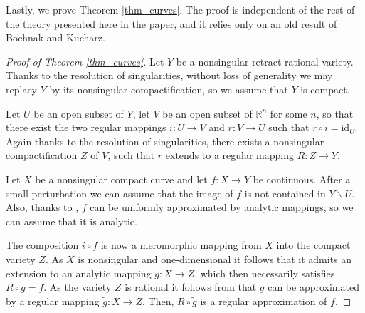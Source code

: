 \documentclass{article}
\theoremstyle{plain}
\theoremstyle{definition}
\theoremstyle{remark}
\newcommand{\R}{\mathbb{R}}
\newcommand{\id}{\mathrm{id}}
\begin{document}
Lastly, we prove Theorem \ref{thm_curves}. The proof is independent of the rest of the theory presented here in the paper, and it relies only on an old result of Bochnak and Kucharz.
\begin{proof}[Proof of Theorem \ref{thm_curves}]
Let $Y$ be a nonsingular retract rational variety. Thanks to the resolution of singularities, without loss of generality we may replacy $Y$ by its nonsingular compactification, so we assume that $Y$ is compact.

Let $U$ be an open subset of $Y$, let $V$ be an open subset of $\R^n$ for some $n$, so that there exist the two regular mappings $i:U\rightarrow V$ and $r:V\rightarrow U$ such that $r\circ i=\id_U$. Again thanks to the resolution of singularities, there exists a nonsingular compactification $Z$ of $V$, such that $r$ extends to a regular mapping $R:Z\rightarrow Y$. 

Let $X$ be a nonsingular compact curve and let $f:X\rightarrow Y$ be continuous. After a small perturbation we can assume that the image of $f$ is not contained in $Y\backslash U$. Also, thanks to \cite[Chapter VII, Theorem 2.25]{guaraldoTopicsRealAnalytic1986}, $f$ can be uniformly approximated by analytic mappings, so we can assume that it is analytic.

The composition $i\circ f$ is now a meromorphic mapping from $X$ into the compact variety $Z$. As $X$ is nonsingular and one-dimensional it follows that it admits an extension to an analytic mapping $g:X\rightarrow Z$, which then necessarily satisfies $R\circ g=f$. As the variety $Z$ is rational it follows from \cite{bochnakWeierstrassApproximationTheorem1999} that $g$ can be approximated by a regular mapping $\tilde{g}:X\rightarrow Z$. Then, $R\circ \tilde{g}$ is a regular approximation of $f$.
\end{proof}
\end{document}
